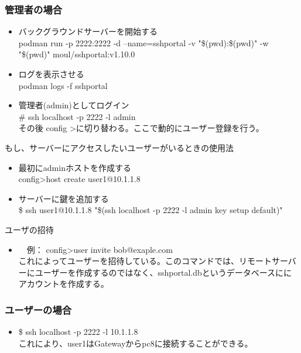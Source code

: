 \documentclass[11pt,a4j,titlepage]{jreport}
\begin{document}
\subsubsection*{管理者の場合}
\begin{itemize}
    \setlength{\parskip}{0.1cm} %
    \setlength{\itemsep}{0.1cm} 
    \item バックグラウンドサーバーを開始する \mbox{}\\podman run -p 2222:2222 -d --name=sshportal -v "\$(pwd):\$(pwd)" -w "\$(pwd)" 
    moul/sshportal:v1.10.0
    \item ログを表示させる\mbox{}\\podman logs -f sshportal
    \item 管理者(admin)としてログイン\mbox{}\\ \# ssh localhost -p 2222 -l admin\\その後 config \textgreater に切り替わる。ここで動的にユーザー登録を行う。
    
\end{itemize}
もし、サーバーにアクセスしたいユーザーがいるときの使用法
\begin{itemize}
    \setlength{\parskip}{0.1cm} %
    \setlength{\itemsep}{0.1cm} 
    \item 最初にadminホストを作成する\mbox{}\\ config\textgreater  host create user1@10.1.1.8
    \item サーバーに鍵を追加する\mbox{} \\ \$ ssh user1@10.1.1.8 "\$(ssh localhost -p 2222 -l admin key setup default)"

\end{itemize}
ユーザの招待
\begin{itemize}
    \setlength{\parskip}{0.1cm} %
    \setlength{\itemsep}{0.1cm} 
    \item　例： config\textgreater user invite bob@exaple.com\mbox{}\\  これによってユーザーを招待している。このコマンドでは、リモートサーバーにユーザーを作成するのではなく、sshportal.dbというデータベースににアカウントを作成する。
\end{itemize}
\setlength{\parskip}{0.1cm} %
\setlength{\itemsep}{0.1cm} 
\subsubsection*{ユーザーの場合}
\begin{itemize}
    \setlength{\parskip}{0.1cm} %
    \setlength{\itemsep}{0.1cm} 
    \item \$ ssh localhost -p 2222 -l 10.1.1.8 \mbox{}\\
    これにより、user1はGatewayからpc8に接続することができる。

\end{itemize}
\end{document}
